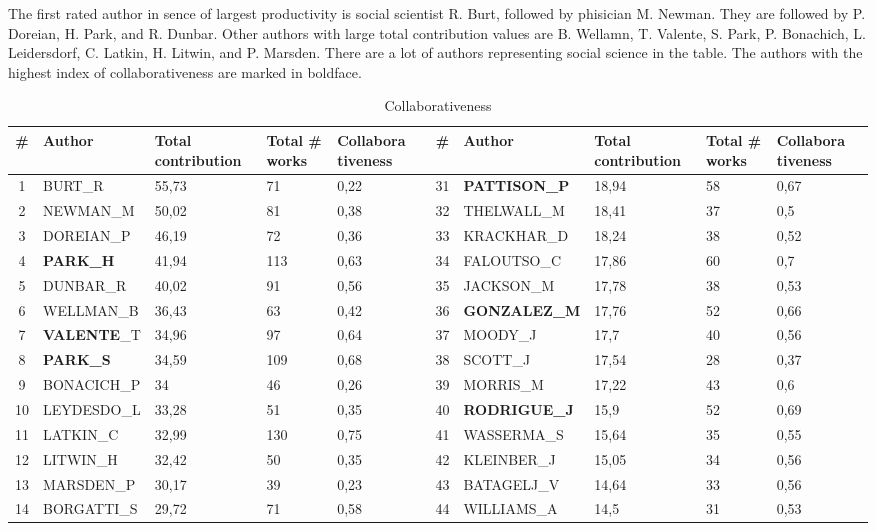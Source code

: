 \documentclass[11pt]{article} %
\begin{document}
The first rated author in sence of largest productivity is social scientist R. Burt, followed by phisician M. Newman. They are followed by P. Doreian, H. Park, and R. Dunbar. Other authors with large total contribution values are B. Wellamn, T. Valente, S. Park, P. Bonachich, L. Leidersdorf, C. Latkin, H. Litwin, and P. Marsden. There are a lot of authors representing social science in the table. The authors with the highest index of collaborativeness are marked in boldface. \medskip 

\begin{table}
\caption{Collaborativeness} \label{collab}\medskip
\small
\renewcommand{\arraystretch}{0.95}
\small
\begin{tabular}{c|l|p{1cm}|p{1cm}|p{1.5cm}||c|l|p{1cm}|p{1cm}|p{1.5cm}|} 
\# & Author & Total contribution & Total \# works & Collabora tiveness & \# & Author & Total contribution & Total \# works & Collabora tiveness \\ \hline
1& 	BURT\_R& 	55,73& 	71& 	0,22& 	31& 	\textbf{PATTISON\_P}& 	18,94& 	58& 	0,67\\
2& 	NEWMAN\_M& 	50,02& 	81& 	0,38& 	32& 	THELWALL\_M& 	18,41& 	37& 	0,5\\
3& 	DOREIAN\_P& 	46,19& 	72& 	0,36& 	33& 	KRACKHAR\_D& 	18,24& 	38& 	0,52\\
4& 	\textbf{PARK\_H}& 	41,94& 	113& 	0,63& 	34& 	FALOUTSO\_C& 	17,86& 	60& 	0,7\\
5& 	DUNBAR\_R& 	40,02& 	91& 	0,56& 	35& 	JACKSON\_M& 	17,78& 	38& 	0,53\\
6& 	WELLMAN\_B& 	36,43& 	63& 	0,42& 	36& 	\textbf{GONZALEZ\_M}& 	17,76& 	52& 	0,66\\
7& 	\textbf{VALENTE}\_T& 	34,96& 	97& 	0,64& 	37& 	MOODY\_J& 	17,7& 	40& 	0,56\\
8& 	\textbf{PARK\_S}& 	34,59& 	109& 	0,68& 	38& 	SCOTT\_J& 	17,54& 	28& 	0,37\\
9& 	BONACICH\_P& 	34& 	46& 	0,26& 	39& 	MORRIS\_M& 	17,22& 	43& 	0,6\\
10& 	LEYDESDO\_L& 	33,28& 	51& 	0,35& 	40& 	\textbf{RODRIGUE\_J}& 	15,9& 	52& 	0,69\\
11& 	LATKIN\_C& 	32,99& 	130& 	0,75& 	41& 	WASSERMA\_S& 	15,64& 	35& 	0,55\\
12& 	LITWIN\_H& 	32,42& 	50& 	0,35& 	42& 	KLEINBER\_J& 	15,05& 	34& 	0,56\\
13& 	MARSDEN\_P& 	30,17& 	39& 	0,23& 	43& 	BATAGELJ\_V& 	14,64& 	33& 	0,56\\
14& 	BORGATTI\_S& 	29,72& 	71& 	0,58& 	44& 	WILLIAMS\_A& 	14,5& 	31& 	0,53\\

\end{tabular}
\end{table}
\end{document}
